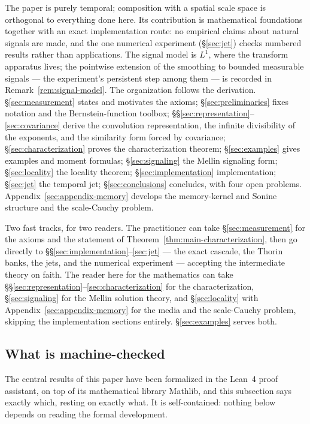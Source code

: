 The paper is purely temporal; composition with a spatial scale space is orthogonal to
everything done here. Its contribution is mathematical foundations together with an exact
implementation route: no empirical claims about natural signals are made, and the one
numerical experiment (\S\ref{sec:jet}) checks numbered results rather than applications.
The signal model is $L^1$, where the transform apparatus lives; the pointwise extension of
the smoothing to bounded measurable signals --- the experiment's persistent step among
them --- is recorded in Remark~\ref{rem:signal-model}.
The organization follows the derivation. \S\ref{sec:measurement}
states and motivates the axioms; \S\ref{sec:preliminaries} fixes notation and the
Bernstein-function toolbox; \S\S\ref{sec:representation}--\ref{sec:covariance} derive the
convolution representation, the infinite divisibility of the exponents, and the similarity
form forced by covariance; \S\ref{sec:characterization} proves the characterization
theorem; \S\ref{sec:examples} gives examples and moment formulas; \S\ref{sec:signaling} the
Mellin signaling form; \S\ref{sec:locality} the locality theorem;
\S\ref{sec:implementation} implementation; \S\ref{sec:jet} the temporal jet;
\S\ref{sec:conclusions} concludes, with four open problems.
Appendix~\ref{sec:appendix-memory} develops the memory-kernel and Sonine structure and the
scale-Cauchy problem.

Two fast tracks, for two readers. The practitioner can take \S\ref{sec:measurement} for
the axioms and the statement of Theorem~\ref{thm:main-characterization}, then go directly
to \S\S\ref{sec:implementation}--\ref{sec:jet} --- the exact cascade, the Thorin banks,
the jets, and the numerical experiment --- accepting the intermediate theory on faith. The
reader here for the mathematics can take
\S\S\ref{sec:representation}--\ref{sec:characterization} for the characterization,
\S\ref{sec:signaling} for the Mellin solution theory, and \S\ref{sec:locality} with
Appendix~\ref{sec:appendix-memory} for the media and the scale-Cauchy problem, skipping
the implementation sections entirely. \S\ref{sec:examples} serves both.

\subsection{What is machine-checked}\label{sec:machine-checked}

The central results of this paper have been formalized in the Lean~4 proof assistant, on top
of its mathematical library Mathlib, and this subsection says exactly which, resting on
exactly what. It is self-contained: nothing below depends on reading the formal development.

